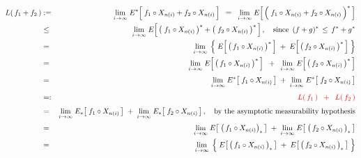 \begin{eqnarray*}
L(\,f_{1} + f_{2}\,)
&:=&
	\underset{i\rightarrow\infty}{\lim}\;
	E^{*}\!\left[\; f_{1} \circ X_{n(i)} \overset{{\color{white}.}}{+} f_{2} \circ X_{n(i)} \,\right]
\;\; = \;\;
	\underset{i\rightarrow\infty}{\lim}\;
	E\!\left[\,\left(\; f_{1} \circ X_{n(i)} \overset{{\color{white}.}}{+} f_{2} \circ X_{n(i)} \,\right)^{*}\,\right]
\\
& \leq &
	\underset{i\rightarrow\infty}{\lim}\;
	E\!\left[\,\left(\;
		f_{1} \circ X_{n(i)}\,\right)^{*}
		\overset{{\color{white}.}}{+}
		\left(\;f_{2} \circ X_{n(i)}
	\,\right)^{*}\,\right],
	\quad
	\textnormal{since \,$(f + g)^{*} \,\leq\, f^{*} +  g^{*}$}
\\
& \overset{{\color{white}1}}{=} &
	\underset{i\rightarrow\infty}{\lim}\;\left\{\;
	E\!\left[\,\left(\,f_{1} \circ X_{n(i)}\,\right)^{*} \,\right]
	\; + \;
	E\!\left[\,\left(\,f_{2} \circ X_{n(i)}\,\right)^{*} \,\right]
	\;\right\}
\\
& \overset{{\color{white}1}}{=} &
	\underset{i\rightarrow\infty}{\lim}\;
	E\!\left[\,\left(\,f_{1} \circ X_{n(i)}\,\right)^{*} \,\right]
	\;\; + \;\;
	\underset{i\rightarrow\infty}{\lim}\;
	E\!\left[\,\left(\,f_{2} \circ X_{n(i)}\,\right)^{*} \,\right]
\\
& \overset{{\color{white}1}}{=} &
	\underset{i\rightarrow\infty}{\lim}\;
	E^{*}\!\left[\; f_{1} \circ X_{n(i)} \,\right]
	\; + \;
	\underset{i\rightarrow\infty}{\lim}\;
	E^{*}\!\left[\; f_{2} \circ X_{n(i)} \,\right]
\\
& \overset{{\color{white}1}}{=:} &
	{\color{red}L(\,f_{1}\,) \;\; + \;\; L(\,f_{2}\,)}
\\
& \overset{{\color{white}1}}{=} &
	\underset{i\rightarrow\infty}{\lim}\;
	E_{*}\!\left[\; f_{1} \circ X_{n(i)} \,\right]
	\; + \;
	\underset{i\rightarrow\infty}{\lim}\;
	E_{*}\!\left[\; f_{2} \circ X_{n(i)} \,\right],
	\quad\textnormal{by the asymptotic measurability hypothesis}
\\
& \overset{{\color{white}1}}{=} &
	\underset{i\rightarrow\infty}{\lim}\;
	E\!\left[\; \left(\,f_{1} \circ X_{n(i)}\right)_{*} \,\right]
	\; + \;
	\underset{i\rightarrow\infty}{\lim}\;
	E\!\left[\; \left(\,f_{2} \circ X_{n(i)}\,\right)_{*} \,\right]
\\
& \overset{{\color{white}1}}{=} &
	\underset{i\rightarrow\infty}{\lim}\;\left\{\;
	E\!\left[\,\left(\,f_{1} \circ X_{n(i)}\,\right)_{*} \,\right]
	\; \overset{{\color{white}.}}{+} \;
	E\!\left[\,\left(\,f_{2} \circ X_{n(i)}\,\right)_{*} \,\right]
	\;\right\}

\end{eqnarray*}
